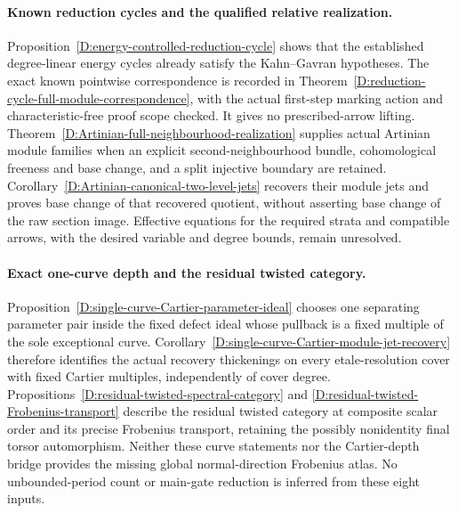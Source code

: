 \paragraph{Known reduction cycles and the qualified relative realization.}
Proposition~\ref{D:energy-controlled-reduction-cycle} shows that
the established degree-linear energy cycles already satisfy the
Kahn--Gavran hypotheses. The exact known pointwise correspondence
is recorded in Theorem~\ref{D:reduction-cycle-full-module-correspondence},
with the actual first-step marking action and characteristic-free
proof scope checked. It gives no prescribed-arrow lifting.
Theorem~\ref{D:Artinian-full-neighbourhood-realization} supplies
actual Artinian module families when an explicit second-neighbourhood
bundle, cohomological freeness and base change, and a split injective
boundary are retained. Corollary~\ref{D:Artinian-canonical-two-level-jets}
recovers their module jets and proves base change of that recovered
quotient, without asserting base change of the raw section image.
Effective equations for the required strata and compatible arrows,
with the desired variable and degree bounds, remain unresolved.

\paragraph{Exact one-curve depth and the residual twisted category.}
Proposition~\ref{D:single-curve-Cartier-parameter-ideal} chooses
one separating parameter pair inside the fixed defect ideal whose
pullback is a fixed multiple of the sole exceptional curve.
Corollary~\ref{D:single-curve-Cartier-module-jet-recovery} therefore
identifies the actual recovery thickenings on every etale-resolution
cover with fixed Cartier multiples, independently of cover degree.
Propositions~\ref{D:residual-twisted-spectral-category} and
\ref{D:residual-twisted-Frobenius-transport} describe the residual
twisted category at composite scalar order and its precise
Frobenius transport, retaining the possibly nonidentity final
torsor automorphism. Neither these curve statements nor the
Cartier-depth bridge provides the missing global normal-direction
Frobenius atlas. No unbounded-period count or main-gate reduction
is inferred from these eight inputs.


